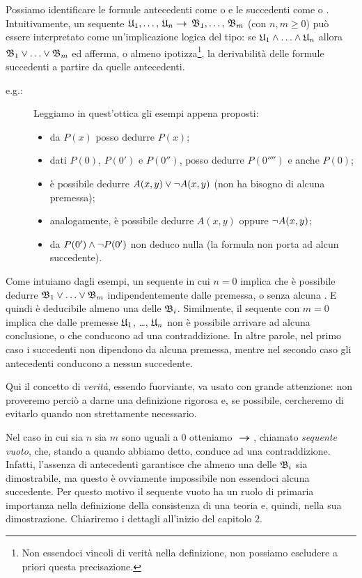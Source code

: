		Possiamo identificare le formule antecedenti come  o  e le succedenti come  o . Intuitivamente, un sequente $\mathfrak{U}_{1},\ldots,\, \mathfrak{U}_{n} \bm{\rightarrow} \, \mathfrak{B}_{1},\ldots,\,\mathfrak{B}_{m}$ (con $n,m\ge0$) può essere interpretato come un'implicazione logica del tipo: se $\mathfrak{U}_{1} \land \ldots \land \mathfrak{U}_{n}$ allora $\mathfrak{B}_{1} \lor \ldots \lor \mathfrak{B}_{m}$ ed afferma, o almeno ipotizza\footnote{Non essendoci vincoli di verità nella definizione, non possiamo escludere a priori questa precisazione.}, la derivabilità delle formule succedenti a partire da quelle antecedenti.
	\begin{description}
		\item[e.g.:] Leggiamo in quest'ottica gli esempi appena proposti:
		\begin{itemize}
			\item da $P(x)$ posso dedurre $P(x)$;
			\item dati $P(0)$, $P(0')$ e $P(0'')$, posso dedurre $P(0'''')$ e anche $P(0)$;
			\item è possibile dedurre $A(x,y) \lor \neg A(x,y)$ (non ha bisogno di alcuna premessa);
			\item analogamente, è possibile dedurre $A(x,y)$ oppure $\neg A(x,y)$;
			\item da $P(0')\land\neg P(0')$ non deduco nulla (la formula non porta ad alcun succedente).
		\end{itemize}
	\end{description}
		Come intuiamo dagli esempi, un sequente in cui $n=0$ implica che è possibile dedurre $\mathfrak{B}_{1} \lor \ldots \lor \mathfrak{B}_{m}$ indipendentemente dalle premessa, o senza alcuna . E quindi è deducibile almeno una delle $\mathfrak{B}_{i}$. Similmente, il sequente con $m=0$ implica che dalle premesse $\mathfrak{U}_{1}$, \ldots , $\mathfrak{U}_{n}$ non è possibile arrivare ad alcuna conclusione, o che conducono ad una contraddizione.
		In altre parole, nel primo caso i succedenti non dipendono da alcuna premessa, mentre nel secondo caso gli antecedenti conducono a nessun succedente.
		
		Qui il concetto di \emph{verità}, essendo fuorviante, va usato con grande attenzione: non proveremo perciò a darne una definizione rigorosa e, se possibile, cercheremo di evitarlo quando non strettamente necessario.
		
		Nel caso in cui sia $n$ sia $m$ sono uguali a $0$ otteniamo $\ \bm{\rightarrow} \; $, chiamato \emph{sequente vuoto}, che, stando a quando abbiamo detto, conduce ad una contraddizione. Infatti, l'assenza di antecedenti garantisce che almeno una delle $\mathfrak{B}_{i}$ sia dimostrabile, ma questo è ovviamente impossibile non essendoci alcuna succedente.
		Per questo motivo il sequente vuoto ha un ruolo di primaria importanza nella definizione della consistenza di una teoria e, quindi, nella sua dimostrazione. Chiariremo i dettagli all'inizio del capitolo $2$.
		
